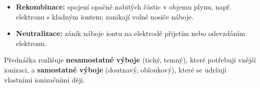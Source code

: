 \begin{itemize}
\item \textbf{Rekombinace:} spojení opačně nabitých částic v objemu plynu, např. elektronu s kladným iontem; zanikají volné nosiče náboje.
\item \textbf{Neutralizace:} zánik náboje iontu na elektrodě přijetím nebo odevzdáním elektronu.
\end{itemize}
Přednáška rozlišuje \textbf{nesamostatné výboje} (tichý, temný), které potřebují vnější ionizaci, a \textbf{samostatné výboje} (doutnavý, obloukový), které se udržují vlastními ionizačními ději.
